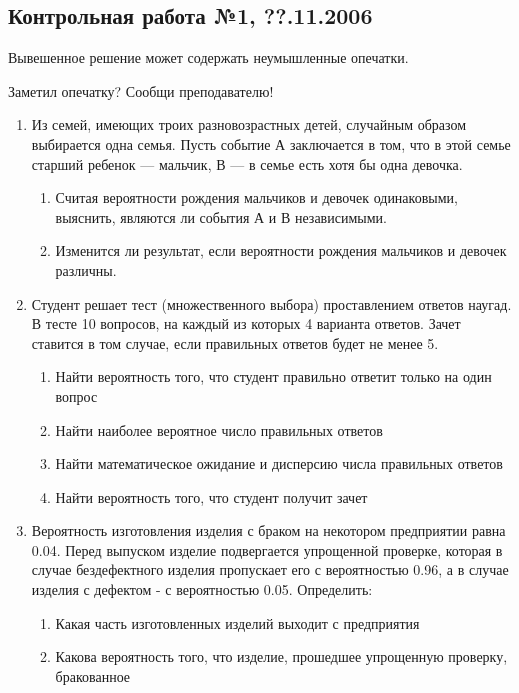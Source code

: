 \subsection{Контрольная работа №1, ??.11.2006}

Вывешенное решение может содержать неумышленные опечатки.

Заметил опечатку? Сообщи преподавателю!

\begin{enumerate}
\item  Из семей, имеющих троих разновозрастных детей, случайным
образом выбирается одна семья. Пусть событие А заключается в том,
что в этой семье
старший ребенок — мальчик, В — в семье есть хотя бы одна девочка.
\begin{enumerate}
\item Считая вероятности рождения мальчиков и девочек одинаковыми,
выяснить, являются ли события А и В независимыми.
\item Изменится ли результат, если вероятности рождения мальчиков и
девочек различны.
\end{enumerate}
\item Студент решает тест (множественного выбора) проставлением
ответов наугад. В тесте 10 вопросов, на каждый из которых 4
варианта ответов. Зачет ставится в том случае, если правильных
ответов будет не менее 5.
\begin{enumerate}
\item Найти вероятность того, что студент правильно ответит только
на один вопрос
\item Найти наиболее вероятное число правильных ответов
\item Найти математическое ожидание и дисперсию числа правильных
ответов
\item Найти вероятность того, что студент получит зачет
\end{enumerate}

\item Вероятность изготовления изделия с браком на некотором
предприятии равна 0.04. Перед выпуском изделие подвергается
упрощенной проверке, которая в случае бездефектного изделия
пропускает его с вероятностью 0.96, а в случае изделия с дефектом
- с вероятностью 0.05. Определить:
\begin{enumerate}
\item Какая часть изготовленных изделий выходит с предприятия
\item Какова вероятность того, что изделие, прошедшее упрощенную
проверку, бракованное
\end{enumerate}


\end{enumerate}
